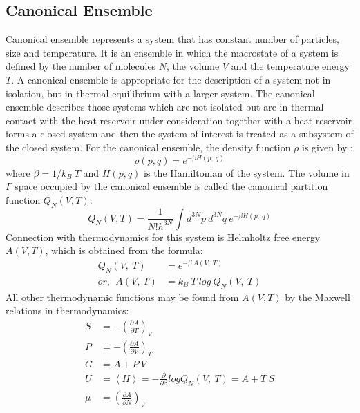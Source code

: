  \subsection{Canonical Ensemble} 
 Canonical ensemble represents a system that has constant number of particles, size and temperature. It is an ensemble in which  the macrostate of a system is defined by the number of molecules $N$, the volume $V$ and the temperature energy $T$. A canonical  ensemble is appropriate for the description of a system not in isolation, but in thermal equilibrium with a larger system.  The  canonical ensemble describes those systems which are not isolated but are in thermal contact with the heat reservoir under consideration together with a heat reservoir forms a closed system and then the system of interest is treated as a subsystem of the closed system. For the canonical ensemble,  the density function $\rho $  is given by \citep{huang2009}: 
 \begin{equation}
 \rho (p, q) = e^{-\beta H(p,~ q)} 
 \end{equation} 
 where $\beta = 1/k_B~T$ and $H(p, q)$ is the Hamiltonian of the system. The volume in $\Gamma$ space occupied by the canonical ensemble is called the canonical partition function $Q_N(V, T)$:
 \begin{equation}
 Q_N(V, T) = \frac {1}{N! h^{3N}}\int d^{3N}p~ d^{3N}q ~ e^{-\beta H(p,~ q)}  
 \end{equation} 
 Connection with thermodynamics for this system is Helmholtz free energy $A (V, T)$, which is obtained from the formula: 
 \begin{align}
 Q_N(V,~T) & = e^{-\beta~A(V,~T)}\nonumber\\
 or, ~~ A(V,~T) &= k_B~T~log~Q_N(V,~T)
 \end{align}
 All other thermodynamic functions may be found from $A(V, T)$ by the Maxwell relations in thermodynamics:
 \begin{align}
    S & = -\left(  \frac{ \partial A} {\partial T }\right)_V  \nonumber \\
    P  &  = - \left(  \frac{ \partial A} {\partial V }\right)_T \nonumber \\
    G & = A + P~ V \\
    U &= \left\langle  H \right\rangle  = - \frac{\partial} {\partial \beta } log Q_N(V,~T) = A + T~S \nonumber \\
    \mu & = \left(  \frac{ \partial A} {\partial N }\right)_V \nonumber
  \end{align}
